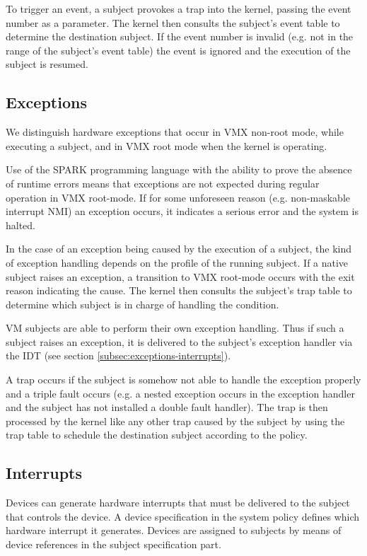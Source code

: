 To trigger an event, a subject provokes a trap into the kernel, passing the
event number as a parameter. The kernel then consults the subject's event table
to determine the destination subject. If the event number is invalid (e.g. not
in the range of the subject's event table) the event is ignored and the
execution of the subject is resumed.

\subsection{Exceptions}\label{subsec:design-exceptions}
We distinguish hardware exceptions that occur in VMX non-root mode, while
executing a subject, and in VMX root mode when the kernel is operating.

Use of the SPARK programming language with the ability to prove the absence of
runtime errors means that exceptions are not expected during regular operation
in VMX root-mode. If for some unforeseen reason (e.g. non-maskable interrupt
NMI) an exception occurs, it indicates a serious error and the system is halted.

In the case of an exception being caused by the execution of a subject, the kind
of exception handling depends on the profile of the running subject. If a native
subject raises an exception, a transition to VMX root-mode occurs with the exit
reason indicating the cause. The kernel then consults the subject's trap table
to determine which subject is in charge of handling the condition.

VM subjects are able to perform their own exception handling. Thus if such a
subject raises an exception, it is delivered to the subject's exception handler
via the IDT (see section \ref{subsec:exceptions-interrupts}).

A trap occurs if the subject is somehow not able to handle the exception
properly and a triple fault occurs (e.g. a nested exception occurs in the
exception handler and the subject has not installed a double fault handler).
The trap is then processed by the kernel like any other trap caused by the
subject by using the trap table to schedule the destination subject according to
the policy.

\subsection{Interrupts}
Devices can generate hardware interrupts that must be delivered to the subject
that controls the device. A device specification in the system policy defines
which hardware interrupt it generates. Devices are assigned to subjects by means
of device references in the subject specification part.

